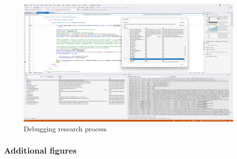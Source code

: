 \begin{figure}[H]
    \centering
    \caption{Debugging research process}
    \label{fig:DebuggingResearchProcess}
    \includegraphics[width=1.0\textwidth]{Figures/DebuggingResearchProcess.png}
\end{figure}


\subsubsection{Additional figures}

